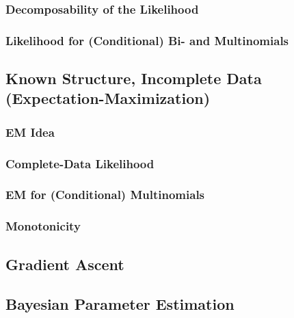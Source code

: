 			\subsubsection{Decomposability of the Likelihood} %

			\subsubsection{Likelihood for (Conditional) Bi- and Multinomials} %

		\subsection{Known Structure, Incomplete Data (Expectation-Maximization)} %

			\subsubsection{EM Idea} %

			\subsubsection{Complete-Data Likelihood} %

			\subsubsection{EM for (Conditional) Multinomials} %

			\subsubsection{Monotonicity} %

		\subsection{Gradient Ascent} %

		\subsection{Bayesian Parameter Estimation} %

